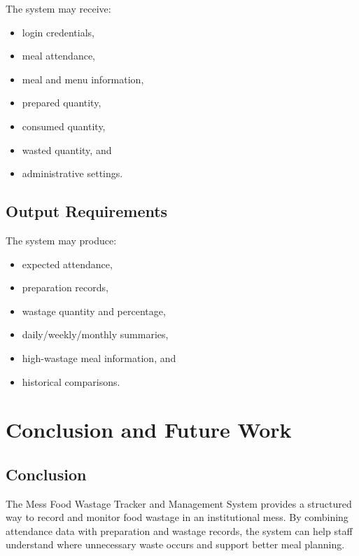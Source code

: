 \documentclass[12pt,a4paper]{report}
\begin{document}
	The system may receive:
	
	\begin{itemize}[leftmargin=*]
		\item login credentials,
		\item meal attendance,
		\item meal and menu information,
		\item prepared quantity,
		\item consumed quantity,
		\item wasted quantity, and
		\item administrative settings.
	\end{itemize}
	
	\section{Output Requirements}
	
	The system may produce:
	
	\begin{itemize}[leftmargin=*]
		\item expected attendance,
		\item preparation records,
		\item wastage quantity and percentage,
		\item daily/weekly/monthly summaries,
		\item high-wastage meal information, and
		\item historical comparisons.
	\end{itemize}
	
	
	
	\chapter{Conclusion and Future Work}
	
	\section{Conclusion}
	
	The Mess Food Wastage Tracker and Management System provides a structured way to record and monitor food wastage in an institutional mess. By combining attendance data with preparation and wastage records, the system can help staff understand where unnecessary waste occurs and support better meal planning.
	
\end{document}
